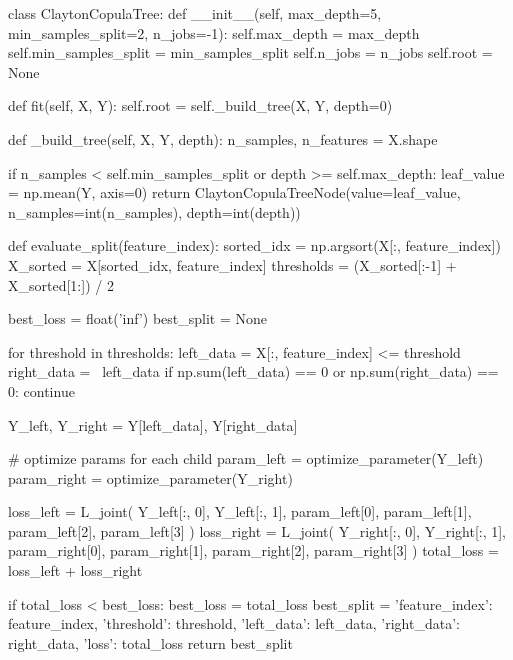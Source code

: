 class ClaytonCopulaTree:
    def __init__(self, max_depth=5, min_samples_split=2, n_jobs=-1):
        self.max_depth = max_depth
        self.min_samples_split = min_samples_split
        self.n_jobs = n_jobs
        self.root = None

    def fit(self, X, Y):
        self.root = self._build_tree(X, Y, depth=0)

    def _build_tree(self, X, Y, depth):
        n_samples, n_features = X.shape

        if n_samples < self.min_samples_split or depth >= self.max_depth:
            leaf_value = np.mean(Y, axis=0)
            return ClaytonCopulaTreeNode(value=leaf_value, n_samples=int(n_samples), depth=int(depth))

        def evaluate_split(feature_index):
            sorted_idx = np.argsort(X[:, feature_index])
            X_sorted = X[sorted_idx, feature_index]
            thresholds = (X_sorted[:-1] + X_sorted[1:]) / 2

            best_loss = float('inf')
            best_split = None

            for threshold in thresholds:
                left_data = X[:, feature_index] <= threshold
                right_data = ~left_data
                if np.sum(left_data) == 0 or np.sum(right_data) == 0:
                    continue

                Y_left, Y_right = Y[left_data], Y[right_data]

                # optimize params for each child
                param_left = optimize_parameter(Y_left)
                param_right = optimize_parameter(Y_right)

                loss_left = L_joint(
                    Y_left[:, 0], Y_left[:, 1],
                    param_left[0], param_left[1], param_left[2], param_left[3]
                )
                loss_right = L_joint(
                    Y_right[:, 0], Y_right[:, 1],
                    param_right[0], param_right[1], param_right[2], param_right[3]
                )
                total_loss = loss_left + loss_right

                if total_loss < best_loss:
                    best_loss = total_loss
                    best_split = {
                        'feature_index': feature_index,
                        'threshold': threshold,
                        'left_data': left_data,
                        'right_data': right_data,
                        'loss': total_loss
                    }
            return best_split

